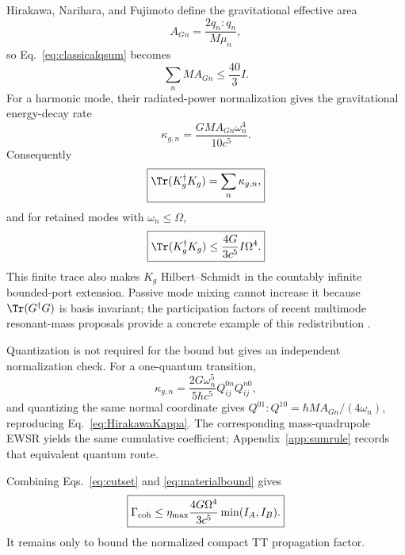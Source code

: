 Hirakawa, Narihara, and Fujimoto define the gravitational effective area \cite{HirakawaNariharaFujimoto1976}
\begin{equation}
A_{Gn}=\frac{2q_n:q_n}{M\mu_n},
\label{eq:HirakawaAG}
\end{equation}
so Eq.~\eqref{eq:classicalqsum} becomes
\begin{equation}
\boxed{\sum_nMA_{Gn}\le\frac{40}{3}I.}
\label{eq:classicalAGsum}
\end{equation}
For a harmonic mode, their radiated-power normalization gives the gravitational energy-decay rate
\begin{equation}
\boxed{
\kappa_{g,n}=\frac{GMA_{Gn}\omega_n^4}{10c^5}.}
\label{eq:HirakawaKappa}
\end{equation}
Consequently
\begin{equation}
\boxed{
\Tr(K_g^\dagger K_g)=\sum_n\kappa_{g,n},}
\label{eq:tracewidths}
\end{equation}
and for retained modes with $\omega_n\le\Omega$,
\begin{equation}
\boxed{
\Tr(K_g^\dagger K_g)
\le\frac{4G}{3c^5}I\Omega^4.}
\label{eq:materialbound}
\end{equation}
This finite trace also makes $K_g$ Hilbert--Schmidt in the countably infinite bounded-port extension. Passive mode mixing cannot increase it because $\Tr(G^\dagger G)$ is basis invariant; the participation factors of recent multimode resonant-mass proposals provide a concrete example of this redistribution \cite{TobarPikovskiTobar2025}.

Quantization is not required for the bound but gives an independent normalization check. For a one-quantum transition,
\begin{equation}
\kappa_{g,n}
=\frac{2G\omega_n^5}{5\hbar c^5}Q_{ij}^{0n}Q_{ij}^{n0},
\label{eq:gravitonrate}
\end{equation}
and quantizing the same normal coordinate gives $Q^{01}:Q^{10}=\hbar M A_{Gn}/(4\omega_n)$, reproducing Eq.~\eqref{eq:HirakawaKappa}. The corresponding mass-quadrupole EWSR yields the same cumulative coefficient; Appendix~\ref{app:sumrule} records that equivalent quantum route.

Combining Eqs.~\eqref{eq:cutset} and \eqref{eq:materialbound} gives
\begin{equation}
\boxed{
\Gamma_{\rm coh}
\le
\eta_{\max}\frac{4G\Omega^4}{3c^5}
\min(I_A,I_B).}
\label{eq:materialcutset}
\end{equation}
It remains only to bound the normalized compact TT propagation factor.
